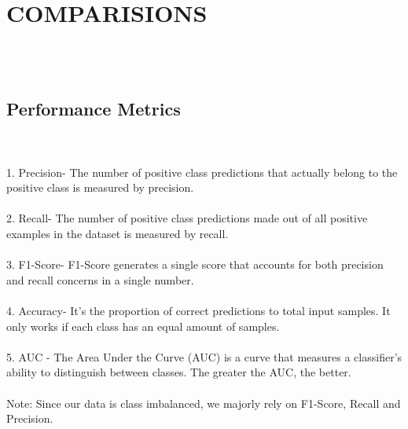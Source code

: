 \documentclass[a4paper, 10pt, conference]{ieeeconf}      %
\begin{document}
\section{\textbf{COMPARISIONS}}
\\\
\\\subsection{\textbf{Performance Metrics}}
\\\
\\1. Precision- The number of positive class predictions that actually belong to the positive class is measured by precision.
\\\
\\2. Recall- The number of positive class predictions made out of all positive examples in the dataset is measured by recall.
\\\
\\3. F1-Score- F1-Score generates a single score that accounts for both precision and recall concerns in a single number.
\\\
\\4. Accuracy- It's the proportion of correct predictions to total input samples. It only works if each class has an equal amount of samples. 
\\\
\\5. AUC - The Area Under the Curve (AUC) is a  curve that measures a classifier's ability to distinguish between classes. The greater the AUC, the better.
\\\
\\Note: Since our data is class imbalanced, we majorly rely on F1-Score, Recall and Precision.
\\\
\end{document}
